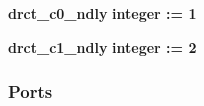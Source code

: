 \begin{DoxyCompactItemize}
\item 
{\bf drct\+\_\+c0\+\_\+ndly} {\bfseries {\bfseries \textcolor{comment}{integer}\textcolor{vhdlchar}{ }\textcolor{vhdlchar}{ }\textcolor{vhdlchar}{\+:}\textcolor{vhdlchar}{=}\textcolor{vhdlchar}{ }\textcolor{vhdlchar}{ } \textcolor{vhdldigit}{1} \textcolor{vhdlchar}{ }}}
\item 
{\bf drct\+\_\+c1\+\_\+ndly} {\bfseries {\bfseries \textcolor{comment}{integer}\textcolor{vhdlchar}{ }\textcolor{vhdlchar}{ }\textcolor{vhdlchar}{\+:}\textcolor{vhdlchar}{=}\textcolor{vhdlchar}{ }\textcolor{vhdlchar}{ } \textcolor{vhdldigit}{2} \textcolor{vhdlchar}{ }}}
\end{DoxyCompactItemize}
\subsubsection*{Ports}
